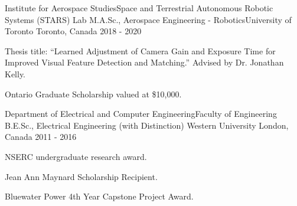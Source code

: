 

\begin{cventries}

  \cventry
    {Institute for Aerospace Studies{\enskip\cdotp\enskip}Space and Terrestrial Autonomous Robotic Systems (STARS) Lab} %
    {M.A.Sc., Aerospace Engineering - Robotics{\enskip\cdotp\enskip}University of Toronto} %
    {Toronto, Canada} %
    {2018 - 2020} %
    {
      \begin{cvitems} %
        \item {Thesis title: ``Learned Adjustment of Camera Gain and Exposure Time for Improved Visual Feature Detection and Matching.'' Advised by Dr. Jonathan Kelly.}
        \item {Ontario Graduate Scholarship valued at \$10,000.}
      \end{cvitems}
    }

  \cventry
    {Department of Electrical and Computer Engineering{\enskip\cdotp\enskip}Faculty of Engineering} %
    {B.E.Sc., Electrical Engineering (with Distinction) {\enskip\cdotp\enskip}Western University} %
    {London, Canada} %
    {2011 - 2016} %
    {
      \begin{cvitems} %
        \item {NSERC undergraduate research award.}
        \item {Jean Ann Maynard Scholarship Recipient.}
        \item {Bluewater Power 4th Year Capstone Project Award.}
      \end{cvitems}
    }

\end{cventries}
